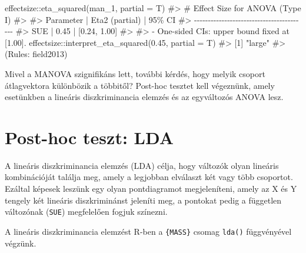 \documentclass[
  letterpaper,
]{krantz}
\makeatletter
\newenvironment{Shaded}{\begin{snugshade}}{\end{snugshade}}
\newcommand{\AttributeTok}[1]{\textcolor[rgb]{0.40,0.45,0.13}{#1}}
\newcommand{\CommentTok}[1]{\textcolor[rgb]{0.37,0.37,0.37}{#1}}
\newcommand{\FloatTok}[1]{\textcolor[rgb]{0.68,0.00,0.00}{#1}}
\newcommand{\FunctionTok}[1]{\textcolor[rgb]{0.28,0.35,0.67}{#1}}
\newcommand{\NormalTok}[1]{\textcolor[rgb]{0.00,0.23,0.31}{#1}}
\newcommand{\SpecialCharTok}[1]{\textcolor[rgb]{0.37,0.37,0.37}{#1}}
\newenvironment{kframe}{%
\medskip{}
\setlength{\fboxsep}{.8em}
 \def\at@end@of@kframe{}%
 \ifinner\ifhmode%
  \def\at@end@of@kframe{\end{minipage}}%
  \begin{minipage}{\columnwidth}%
 \fi\fi%
 \def\FrameCommand##1{\hskip\@totalleftmargin \hskip-\fboxsep
 \colorbox{shadecolor}{##1}\hskip-\fboxsep
     \hskip-\linewidth \hskip-\@totalleftmargin \hskip\columnwidth}%
 \MakeFramed {\advance\hsize-\width
   \@totalleftmargin\z@ \linewidth\hsize
   \@setminipage}}%
 {\par\unskip\endMakeFramed%
 \at@end@of@kframe}
\renewenvironment{Shaded}{\begin{kframe}}{\end{kframe}}
\makeatother
\begin{document}
\begin{Shaded}
\begin{Highlighting}[]
\NormalTok{effectsize}\SpecialCharTok{::}\FunctionTok{eta\_squared}\NormalTok{(man\_1, }\AttributeTok{partial =}\NormalTok{ T)}
\CommentTok{\#\textgreater{} \# Effect Size for ANOVA (Type I)}
\CommentTok{\#\textgreater{} }
\CommentTok{\#\textgreater{} Parameter | Eta2 (partial) |       95\% CI}
\CommentTok{\#\textgreater{} {-}{-}{-}{-}{-}{-}{-}{-}{-}{-}{-}{-}{-}{-}{-}{-}{-}{-}{-}{-}{-}{-}{-}{-}{-}{-}{-}{-}{-}{-}{-}{-}{-}{-}{-}{-}{-}{-}{-}{-}{-}}
\CommentTok{\#\textgreater{} SUE       |           0.45 | [0.24, 1.00]}
\CommentTok{\#\textgreater{} }
\CommentTok{\#\textgreater{} {-} One{-}sided CIs: upper bound fixed at [1.00].}
\NormalTok{effectsize}\SpecialCharTok{::}\FunctionTok{interpret\_eta\_squared}\NormalTok{(}\FloatTok{0.45}\NormalTok{, }\AttributeTok{partial =}\NormalTok{ T)}
\CommentTok{\#\textgreater{} [1] "large"}
\CommentTok{\#\textgreater{} (Rules: field2013)}
\end{Highlighting}
\end{Shaded}

Mivel a MANOVA szignifikáns lett, további kérdés, hogy melyik csoport
átlagvektora különbözik a többitől? Post-hoc tesztet kell végeznünk,
amely esetünkben a lineáris diszkriminancia elemzés és az egyváltozós
ANOVA lesz.

\hypertarget{post-hoc-teszt-lda}{%
\section{Post-hoc teszt: LDA}\label{post-hoc-teszt-lda}}

A lineáris diszkriminancia elemzés (LDA) célja, hogy változók olyan
lineáris kombinációját találja meg, amely a legjobban elválaszt két vagy
több csoportot. Ezáltal képesek leszünk egy olyan pontdiagramot
megjeleníteni, amely az X és Y tengely két lineáris diszkriminánst
jeleníti meg, a pontokat pedig a független változónak (\texttt{SUE})
megfelelően fogjuk színezni.

A lineáris diszkriminancia elemzést R-ben a \texttt{\{MASS\}} csomag
\texttt{lda()} függvényével végzünk.
\end{document}
